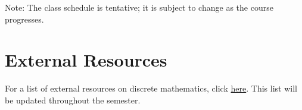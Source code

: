 \documentclass[letterpaper]{inzane_syllabus} %
\begin{document}
\begin{center}
\begin{tabularx}{\textwidth}{p{2cm}p{2cm}p{8cm}p{9.5cm}}
%
\hline 
\end{tabularx}
Note: The class schedule is tentative; it is subject to change as the course progresses.
\end{center}

\vspace{1cm}
\section{External Resources}

For a list of external resources on discrete mathematics, click  \href{https://github.com/mikewojnowicz/csci246_spring2025/blob/main/LINKS.md}{here}.  This list will be updated throughout the semester.

\vspace{0.5cm}


\end{document}
